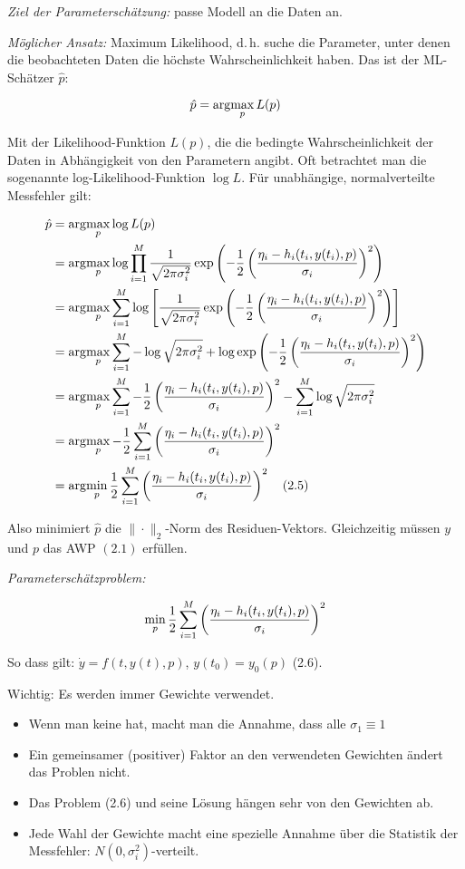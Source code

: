 \emph{Ziel der Parameterschätzung:} passe Modell an die Daten an.

\emph{Möglicher Ansatz:} Maximum Likelihood, d.\,h. suche die Parameter, unter denen die beobachteten Daten die höchste Wahrscheinlichkeit haben. Das ist der ML-Schätzer $\hat p$:

\[\hat p = \arg\!\max_p L(p)\]

Mit der Likelihood-Funktion $L(p)$, die die bedingte Wahrscheinlichkeit der Daten in Abhängigkeit von den Parametern angibt. Oft betrachtet man die sogenannte log-Likelihood-Funktion $\log L$. Für unabhängige, normalverteilte Messfehler gilt:

\begin{align*}
\hat p &= \arg\!\max_p \log L(p)\\
&= \arg\!\max_p \log \prod_{i=1}^M \frac 1{\sqrt{2\pi \sigma_i^2}} \exp\left( -\frac 12 \left(\frac{\eta_i-h_i(t_i,y(t_i),p)}{\sigma_i} \right)^2 \right) \\
&= \arg\!\max_p \sum_{i=1}^M \log \left[\frac 1{\sqrt{2\pi \sigma_i^2}} \exp\left( -\frac 12 \left(\frac{\eta_i-h_i(t_i,y(t_i),p)}{\sigma_i} \right)^2 \right)\right] \\
&= \arg\!\max_p \sum_{i=1}^M -\log \sqrt{2\pi \sigma_i^2} + \log \exp\left( -\frac 12 \left(\frac{\eta_i-h_i(t_i,y(t_i),p)}{\sigma_i} \right)^2 \right) \\
&= \arg\!\max_p \sum_{i=1}^M -\frac 12 \left(\frac{\eta_i-h_i(t_i,y(t_i),p)}{\sigma_i} \right)^2 - \sum_{i=1}^M \log \sqrt{2\pi \sigma_i^2} \\
&= \arg\!\max_p - \frac 12 \sum_{i=1}^M \left(\frac{\eta_i-h_i(t_i,y(t_i),p)}{\sigma_i} \right)^2 \\
&= \arg\!\min_p \frac 12 \sum_{i=1}^M \left(\frac{\eta_i-h_i(t_i,y(t_i),p)}{\sigma_i} \right)^2 \quad (2.5)\\
\end{align*}

Also minimiert $\hat p$ die $\|\cdot\|_2$-Norm des Residuen-Vektors. Gleichzeitig müssen $y$ und $p$ das AWP $(2.1)$ erfüllen.

\emph{Parameterschätzproblem:}

\[\min_p \frac 12 \sum_{i=1}^M \left(\frac{\eta_i - h_i(t_i,y(t_i),p)}{\sigma_i}\right)^2\]

So dass gilt: $\dot y = f(t,y(t),p)$, $y(t_0) = y_0(p)$ (2.6).

Wichtig: Es werden immer Gewichte verwendet.

\begin{itemize}
\item Wenn man keine hat, macht man die Annahme, dass alle $\sigma_1 \equiv 1$
\item Ein gemeinsamer (positiver) Faktor an den verwendeten Gewichten ändert das Problen nicht.
\item Das Problem (2.6) und seine Lösung hängen sehr von den Gewichten ab.
\item Jede Wahl der Gewichte macht eine spezielle Annahme über die Statistik der Messfehler: $N(0,\sigma_i^2)$-verteilt.
\end{itemize}

